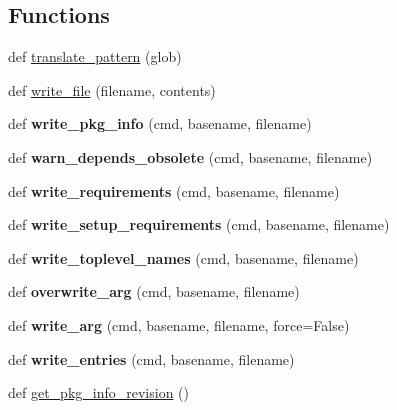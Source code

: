 \subsection*{Functions}
\begin{DoxyCompactItemize}
\item 
def \hyperlink{namespacesetuptools_1_1command_1_1egg__info_aa144258099051fcc4002b9750d064587}{translate\+\_\+pattern} (glob)
\item 
def \hyperlink{namespacesetuptools_1_1command_1_1egg__info_a3f7abc3fba29e56b617aa9b520a4ec92}{write\+\_\+file} (filename, contents)
\item 
\mbox{\label{namespacesetuptools_1_1command_1_1egg__info_ab2a1d559ee9ac96e67be5107f4f1e326}} 
def {\bfseries write\+\_\+pkg\+\_\+info} (cmd, basename, filename)
\item 
\mbox{\label{namespacesetuptools_1_1command_1_1egg__info_a8328fab813b7049a7850641b991f06f4}} 
def {\bfseries warn\+\_\+depends\+\_\+obsolete} (cmd, basename, filename)
\item 
\mbox{\label{namespacesetuptools_1_1command_1_1egg__info_aa61f1a6ac6acab068d1bb5636d0518dc}} 
def {\bfseries write\+\_\+requirements} (cmd, basename, filename)
\item 
\mbox{\label{namespacesetuptools_1_1command_1_1egg__info_ab882835b091bf0f8ebfa2a5aab386681}} 
def {\bfseries write\+\_\+setup\+\_\+requirements} (cmd, basename, filename)
\item 
\mbox{\label{namespacesetuptools_1_1command_1_1egg__info_ac21207e4cdc389c274f78ba07d6827bc}} 
def {\bfseries write\+\_\+toplevel\+\_\+names} (cmd, basename, filename)
\item 
\mbox{\label{namespacesetuptools_1_1command_1_1egg__info_ada555a3b6131089b7a4d6a29c41350b6}} 
def {\bfseries overwrite\+\_\+arg} (cmd, basename, filename)
\item 
\mbox{\label{namespacesetuptools_1_1command_1_1egg__info_a25f4fcbcc6aaa9f956521ad1aa5c66a3}} 
def {\bfseries write\+\_\+arg} (cmd, basename, filename, force=False)
\item 
\mbox{\label{namespacesetuptools_1_1command_1_1egg__info_a793b9c5d75faf66badb7729625f988a0}} 
def {\bfseries write\+\_\+entries} (cmd, basename, filename)
\item 
def \hyperlink{namespacesetuptools_1_1command_1_1egg__info_ac6d4da2fc87ba11bb3042e35ae77c7ed}{get\+\_\+pkg\+\_\+info\+\_\+revision} ()
\end{DoxyCompactItemize}


